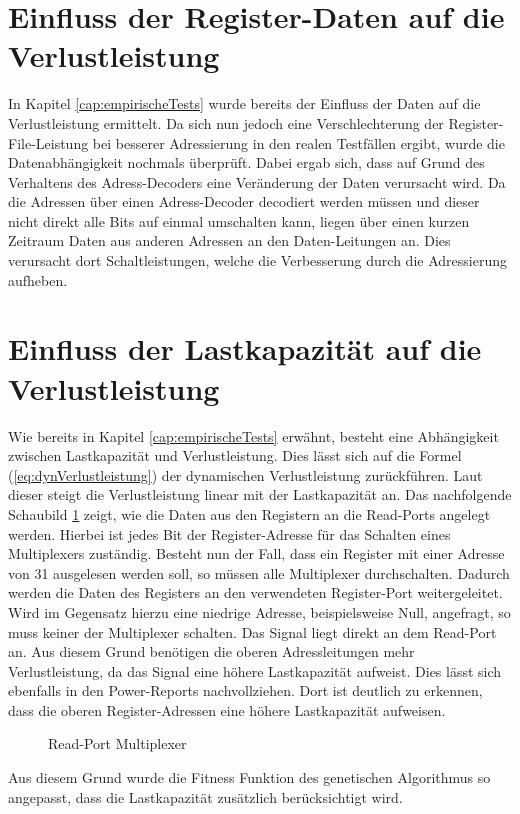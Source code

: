 \section{Einfluss der Register-Daten auf die Verlustleistung}
In Kapitel \ref{cap:empirischeTests} wurde bereits der Einfluss der Daten auf die Verlustleistung ermittelt. Da sich nun jedoch eine Verschlechterung der Register-File-Leistung bei besserer Adressierung in den realen Testfällen ergibt, wurde die Datenabhängigkeit nochmals überprüft. Dabei ergab sich, dass auf Grund des Verhaltens des Adress-Decoders eine Veränderung der Daten verursacht wird. Da die Adressen über einen Adress-Decoder decodiert werden müssen und dieser nicht direkt alle Bits auf einmal umschalten kann, liegen über einen kurzen Zeitraum Daten aus anderen Adressen an den Daten-Leitungen an. Dies verursacht dort Schaltleistungen, welche die Verbesserung durch die Adressierung aufheben.
%

\section{Einfluss der Lastkapazität auf die Verlustleistung}
 \label{cap:lastkapa}
Wie bereits in Kapitel \ref{cap:empirischeTests} erwähnt, besteht eine Abhängigkeit zwischen Lastkapazität und Verlustleistung. Dies lässt sich auf die Formel (\ref{eq:dynVerlustleistung}) der dynamischen Verlustleistung zurückführen. Laut dieser steigt die Verlustleistung linear mit der Lastkapazität an.
Das nachfolgende Schaubild \ref{fig:read_port_mux} zeigt, wie die Daten aus den Registern an die Read-Ports angelegt werden. Hierbei ist jedes Bit der Register-Adresse für das Schalten eines Multiplexers zuständig. Besteht nun der Fall, dass ein Register mit einer Adresse von 31 ausgelesen werden soll, so müssen alle Multiplexer durchschalten. Dadurch werden die Daten des Registers an den verwendeten Register-Port weitergeleitet. Wird im Gegensatz hierzu eine niedrige Adresse, beispielsweise Null, angefragt, so muss keiner der Multiplexer schalten. Das Signal liegt direkt an dem Read-Port an. Aus diesem Grund benötigen die oberen Adressleitungen mehr Verlustleistung, da das Signal eine höhere Lastkapazität aufweist. Dies lässt sich ebenfalls in den Power-Reports nachvollziehen. Dort ist deutlich zu erkennen, dass die oberen Register-Adressen eine höhere Lastkapazität aufweisen. 
\begin{scriptsize}
	\begin{figure}[htbp] 
		\centering
		
		\caption{Read-Port Multiplexer}
		\label{fig:read_port_mux}
	\end{figure}
\end{scriptsize}

Aus diesem Grund wurde die Fitness Funktion des genetischen Algorithmus so angepasst, dass die Lastkapazität zusätzlich berücksichtigt wird.
